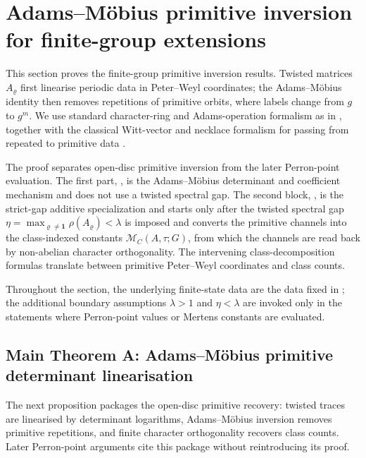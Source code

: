 \section{Adams--M\"obius primitive inversion for finite-group extensions}
\label{sec:chebotarev}

This section proves the finite-group primitive inversion results. Twisted matrices
\(A_\varrho\) first linearise periodic data in Peter--Weyl coordinates;
the Adams--M\"obius identity then removes repetitions of primitive
orbits, where labels change from \(g\) to \(g^m\). We use standard
character-ring and Adams-operation formalism as in
\cite{AtiyahTall1969GroupRepresentationsLambdaRings,Serre1977LinearRepresentations,Knutson1973LambdaRings}, together with
the classical Witt-vector and necklace formalism for passing from
repeated to primitive data
\cite{DressSiebeneicher1988BurnsideRing,MetropolisRota1983Necklaces,Wehrhahn1990AperiodicRings}.

The proof separates open-disc primitive inversion from the later Perron-point
evaluation.  The first part,
,
is the Adams--M\"obius determinant and coefficient
mechanism and does not use a twisted spectral gap. The second block,
  , is the strict-gap additive specialization and starts only
after the twisted spectral gap
\(\eta=\max_{\varrho\neq\mathbf 1}\rho(A_\varrho)<\lambda\) is imposed
and converts the primitive channels into the class-indexed constants
\(\mathcal M_C(A,\tau;G)\), from which the channels are read back by
non-abelian character orthogonality. The intervening class-decomposition
formulas translate between primitive Peter--Weyl coordinates and class counts.

Throughout the section, the underlying finite-state data are the data
fixed in ; the additional boundary
assumptions \(\lambda>1\) and \(\eta<\lambda\) are invoked only in the
statements where Perron-point values or Mertens constants are evaluated.

\subsection{Main Theorem A: Adams--M\"obius primitive determinant
linearisation}

The next proposition packages the open-disc primitive recovery: twisted traces
are linearised by determinant logarithms, Adams--M\"obius inversion removes
primitive repetitions, and finite character orthogonality recovers class
counts.  Later Perron-point arguments cite this package without reintroducing
its proof.

